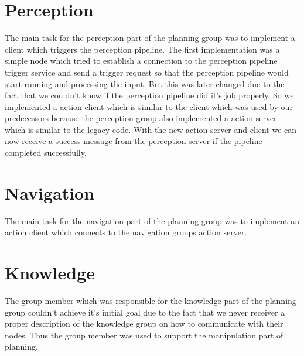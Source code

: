 \documentclass[main.tex]{subfiles}
\begin{document}
		\section{Perception}

		The main task for the perception part of the planning group was to implement a client which triggers the perception pipeline.
		The first implementation was a simple node which tried to establish a connection to the perception pipeline trigger service and send a trigger request so that the perception pipeline would start running and processing the input. But this was later changed due to the fact that we couldn't know if the perception pipeline did it's job properly.
		So we implemented a action client which is similar to the client which was used by our predecessors because the perception group also implemented a action server which is similar to the legacy code. With the new action server and client we can now receive a success message from the perception server if the pipeline completed successfully.

		\section{Navigation}

                The main task for the navigation part of the planning group was to implement an action client which connects to the navigation groups action server.

		\section{Knowledge}

                The group member which was responsible for the knowledge part of the planning group couldn't achieve it's initial goal due to the fact that we never receiver a proper description of the knowledge group on how to communicate with their nodes. Thus the group member was used to support the manipulation part of planning.
\end{document}
